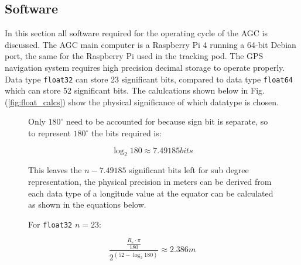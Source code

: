 \documentclass[11pt,landscape]{article}
\begin{document}
\newpage
\begin{multicols}{3}
\section{Software}
\label{software}
In this section all software required for the operating cycle of the AGC is
discussed. The AGC main computer is a Raspberry Pi 4 running a 64-bit Debian
port, the same for the Raspberry Pi used in the tracking pod. The GPS
navigation system requires high precision decimal storage to operate properly.
Data type \verb|float32| can store 23 significant bits, compared to data type
\verb|float64| which can store 52 significant
bits\cite{floating_point_goldberg}. The calulcations shown below in Fig.
(\ref{fig:float_calcs}) show the physical significance of which datatype is
chosen.
\begin{figure}[H]
    \begin{mdframed}
        Only $180^{\circ}$ need to be accounted for because sign bit is
        separate, so to represent $180^{\circ}$ the bits required is:
        \begin{center}
            \begin{equation*}
                \log_2{180} \approx 7.49185 bits
            \end{equation*}
        \end{center}
        This leaves the $n - 7.49185$ significant bits left for sub degree
        representation, the physical precision in meters can be derived from
        each data type of a longitude value at the equator can be calculated as
        shown in the equations below.\newline
        \begin{center}
            \begin{minipage}{0.45\textwidth}
                \begin{mdframed}
                    For \verb|float32| $n=23$:
                    \begin{center}
                        \begin{equation*}
                            \frac{\frac{R_e \cdot \pi}{180}}{2^{\left(52 - \log_2{180}\right)}} \approx 2.386m
                            \label{eq}
                        \end{equation*}
                    \end{center}
                \end{mdframed}
                \end{minipage}

\end{center}
\end{mdframed}
\end{figure}
\end{multicols}
\end{document}
